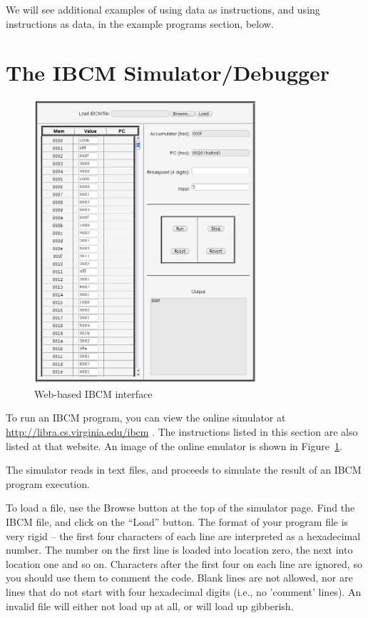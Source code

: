We will see additional examples of using data as instructions, and
using instructions as data, in the example programs section, below.


\section{The IBCM Simulator/Debugger}

\begin{figure}
\centering
\vspace{-0.15in}
\includegraphics[width=3.25in]{ibcm/www-screen-shot.png}
\caption{Web-based IBCM interface}
\label{wwwinterface}
\vspace{-0.25in}
\end{figure}

To run an IBCM program, you can view the online simulator at
\url{http://libra.cs.virginia.edu/ibcm} \cite{ibcm-website}.  The
instructions listed in this section are also listed at that website.
An image of the online emulator is shown in Figure~\ref{wwwinterface}.

The simulator reads in text files, and proceeds to simulate the
result of an IBCM program execution.

To load a file, use the Browse button at the top of the simulator
page. Find the IBCM file, and click on the ``Load'' button. The format
of your program file is very rigid -- the first four characters of
each line are interpreted as a hexadecimal number. The number on the
first line is loaded into location zero, the next into location one
and so on. Characters after the first four on each line are ignored,
so you should use them to comment the code.  Blank lines are not
allowed, nor are lines that do not start with four hexadecimal digits
(i.e., no 'comment' lines).  An invalid file will either not load up
at all, or will load up gibberish.

